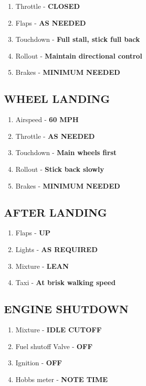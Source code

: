 \documentclass[14pt,letterpaper, twoside]{extarticle}
\begin{document}
\begin{enumerate}
\item Throttle - \textbf{CLOSED}
\item Flaps - \textbf{AS NEEDED}
\item Touchdown - \textbf{Full stall, stick full back}
\item Rollout - \textbf{Maintain directional control}
\item Brakes - \textbf{MINIMUM NEEDED}
\end{enumerate}

\subsection{WHEEL LANDING}

\begin{enumerate}
\item Airspeed - \textbf{60 MPH}
\item Throttle - \textbf{AS NEEDED}
\item Touchdown - \textbf{Main wheels first}
\item Rollout - \textbf{Stick back slowly}
\item Brakes - \textbf{MINIMUM NEEDED}
\end{enumerate}
	
\subsection{AFTER LANDING}
\begin{enumerate}
\item Flaps - \textbf{UP}
\item Lights - \textbf{AS REQUIRED}
\item Mixture - \textbf{LEAN}
\item Taxi - \textbf{At brisk walking speed}  
\end{enumerate}

\subsection{ENGINE SHUTDOWN}
\begin{enumerate}
\item Mixture - \textbf{IDLE CUTOFF}
\item Fuel shutoff Valve - \textbf{OFF}
\item Ignition - \textbf{OFF}
\item Hobbs meter - \textbf{NOTE TIME}
\end{enumerate}
	
\end{document}
